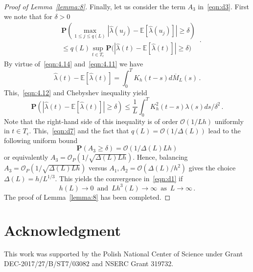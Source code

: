 \documentclass[lettersize,journal,onecolumn]{IEEEtran}
\theoremstyle{definition}
\newcommand{\E}[1]{\mathbb{E}\left[#1\right]}
\begin{document}
\begin{proof}[Proof of Lemma~\ref{lemma:8}]
	Finally, let us consider the term $A_{3}$ in~\eqref{eqn:d3}. First we note that for 
	$\delta>0$
	\begin{equation}
		\begin{split}
			& \mathbf{P}\left(
			\max_{1\leq j\leq q(L)} \left|
			\widehat{\lambda}(u_{j}) - \E{\widehat{\lambda}(u_{j})}
			\right| \geq \delta
			\right) \\
			& \leq q(L) \sup_{t\in T_{\epsilon}} \mathbf{P}\bigg(
			\left|
			\widehat{\lambda}(t) - \E{\widehat{\lambda}(t)}
			\right| \geq \delta
			\bigg)
		\end{split}
		\label{eqn:d7} \,.
	\end{equation}
	By virtue of~\eqref{eqn:4.14} and~\eqref{eqn:4.11} we have
	\begin{equation*}
		\widehat{\lambda}(t) - \E{\widehat{\lambda}(t)} = \int_{0}^{T}
		K_{h}(t-s) d\overline{M}_{L}(s)
		\,.
	\end{equation*}
	This,~\eqref{eqn:4.12} and Chebyshev inequality yield
	\begin{equation*}
		\mathbf{P}\left(
		\left|
		\widehat{\lambda}(t) - \E{\widehat{\lambda}(t)}
		\right| \geq \delta
		\right) \leq \frac{1}{L} \int_{0}^{T} K^{2}_{h}(t-s)\lambda(s)ds/\delta^{2}
		\,.
	\end{equation*}
	Note that the right-hand side of this inequality is of order $\mathcal{O}(1/Lh)$ 
	uniformly in $t\in T_{\epsilon}$. This,~\eqref{eqn:d7} and the fact that
	$q(L) = \mathcal{O}(1/\Delta(L))$
	lead to the following uniform bound
	\begin{equation*}
		\mathbf{P}\left(A_{3}\geq\delta\right) = \mathcal{O}\left(
		1/\Delta(L)Lh
		\right)
	\end{equation*}
	or equivalently \mbox{$
		A_{3} = \mathcal{O}_{P}\left(1/\sqrt{\Delta(L)Lh}\right)	
		$}. 
	Hence, balancing $A_{3} = \mathcal{O}_{P}\left(1/\sqrt{\Delta(L)Lh}\right)$
	versus $A_1, A_2 = \mathcal{O}(\Delta(L)/h^2)$ gives the choice 
	\mbox{$\Delta(L)=h/L^{1/3}$}. This yields the convergence in~\eqref{eqn:d1} if
	\begin{equation*}
		h(L) \to 0
		\enspace \text{and}
		\enspace Lh^{3}(L) \to \infty
		\enspace \text{as}
		\enspace L \to \infty
		\,.
	\end{equation*}
	The proof of Lemma~\ref{lemma:8} has been completed.
\end{proof}

\section*{Acknowledgment}
\noindent This work was supported by the Polish National Center of Science under
Grant DEC-2017/27/B/ST7/03082 and NSERC Grant 319732.
\end{document}
